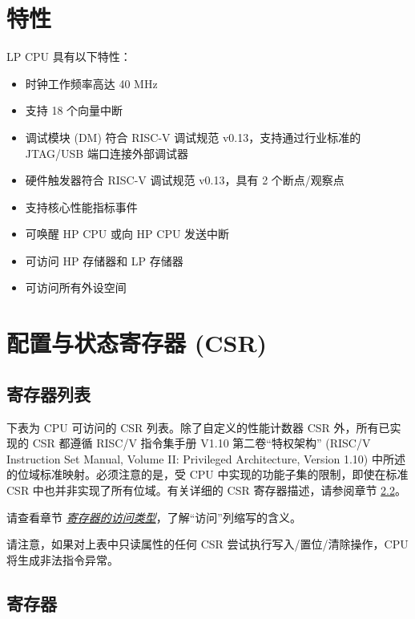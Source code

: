 \documentclass[main\_\_CN.tex]{subfiles}
\begin{document}
\section{特性}
\label{sec:ulp-features}

LP CPU 具有以下特性：

\begin{itemize}
    \item 时钟工作频率高达 40 MHz
    \item 支持 18 个向量中断
    \item 调试模块 (DM) 符合 RISC-V 调试规范 v0.13，支持通过行业标准的 JTAG/USB 端口连接外部调试器
    \item 硬件触发器符合 RISC-V 调试规范 v0.13，具有 2 个断点/观察点
    \item 支持核心性能指标事件
    \item 可唤醒 HP CPU 或向 HP CPU 发送中断
    \item 可访问 HP 存储器和 LP 存储器
    \item 可访问所有外设空间

\end{itemize}

\section{配置与状态寄存器 (CSR)}
\hypertarget{ulp-reg-summ}{}
\subsection{寄存器列表}
\label{sec:ulp-reg-summ}


下表为 CPU 可访问的 CSR 列表。除了自定义的性能计数器 CSR 外，所有已实现的 CSR 都遵循 RISC\-/V 指令集手册 V1.10 第二卷“特权架构” (RISC\-/V Instruction Set Manual, Volume II: Privileged Architecture, Version 1.10) 中所述的位域标准映射。必须注意的是，受 CPU 中实现的功能子集的限制，即使在标准 CSR 中也并非实现了所有位域。有关详细的 CSR 寄存器描述，请参阅章节 \ref{sec:ulp-reg}。

请查看章节 \hyperref[glossary-access-types]{\textit{寄存器的访问类型}}，了解“访问”列缩写的含义。



请注意，如果对上表中只读属性的任何 CSR 尝试执行写入/置位/清除操作，CPU 将生成非法指令异常。

\subsection{寄存器}
\label{sec:ulp-reg}
\end{document}
